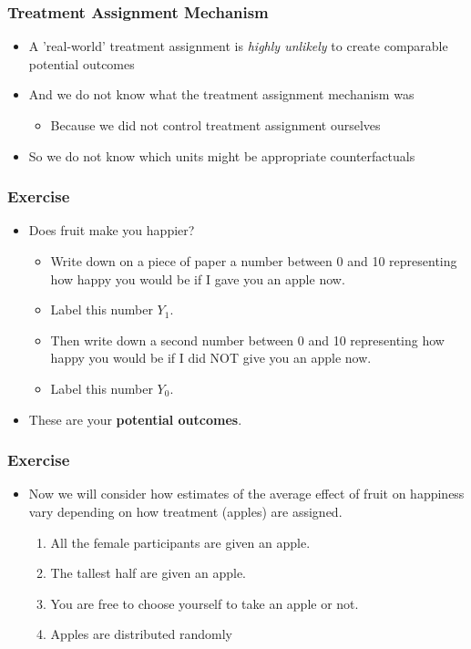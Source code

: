 \documentclass[xcolor=x11names,compress]{beamer}\usepackage[]{graphicx}\usepackage[]{color}
\renewcommand{\(}{\begin{columns}}
\renewcommand{\)}{\end{columns}}
\newcommand{\<}[1]{\begin{column}{#1}}
\renewcommand{\>}{\end{column}}
\begin{document}
\begin{frame}
\frametitle{Treatment Assignment Mechanism}
\begin{itemize}
\item A 'real-world' treatment assignment is \textit{highly unlikely} to create comparable potential outcomes
\pause
\item And we do not know what the treatment assignment mechanism was
\begin{itemize}
\item Because we did not control treatment assignment ourselves
\pause
\end{itemize}
\pause
\item So we do not know which units might be appropriate counterfactuals
\end{itemize}
\end{frame}


\begin{frame}
\frametitle{Exercise}
\begin{itemize}
\item Does fruit make you happier? 
\pause
\begin{itemize}
\item Write down on a piece of paper a number between 0 and 10 representing how happy you would be if I gave you an apple now. 
\pause
\item Label this number $Y_1$.
\pause
\item Then write down a second number between 0 and 10 representing how happy you would be if I did NOT give you an apple now. 
\pause
\item Label this number $Y_0$.
\pause
\end{itemize}
\item These are your \textbf{potential outcomes}.
\end{itemize}
\end{frame}

\begin{frame}
\frametitle{Exercise}
\begin{itemize}
\item Now we will consider how estimates of the average effect of fruit on happiness vary depending on how treatment (apples) are assigned.
\pause
\begin{enumerate}
\item All the female participants are given an apple.
\pause
\item The tallest half are given an apple.
\pause
\item You are free to choose yourself to take an apple or not.
\pause
\item Apples are distributed randomly
\end{enumerate}
\end{itemize}
\end{frame}
\end{document}
